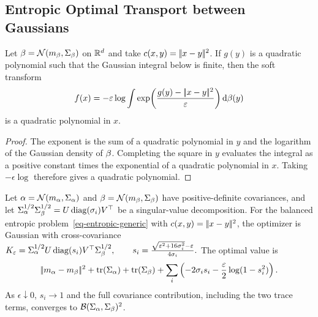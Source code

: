 \subsection{Entropic Optimal Transport between Gaussians}
\label{sec-gaussian-sinkhorn}
\begin{prop}\label{prop-gaussian-sinkhorn-closure}
Let $\beta=\mathcal{N}(m_\beta,\Sigma_\beta)$ on $\mathbb{R}^d$ and take $c(x,y)=|\!| x-y |\!|^2$. If $g(y)$ is a quadratic polynomial such that the Gaussian integral below is finite, then the soft transform
\[
f(x)
=
-\varepsilon\log
\int
\exp\!\left(\frac{g(y)-|\!| x-y |\!|^2}{\varepsilon}\right)
\mathrm{d}\beta(y)
\]
is a quadratic polynomial in $x$.
\end{prop}
\begin{proof}
The exponent is the sum of a quadratic polynomial in $y$ and the logarithm of the Gaussian density of $\beta$. Completing the square in $y$ evaluates the integral as a positive constant times the exponential of a quadratic polynomial in $x$. Taking $-\epsilon\log$ therefore gives a quadratic polynomial.
\end{proof}
\begin{prop}\label{prop-gaussian-sinkhorn-closed-form}
Let $\alpha=\mathcal{N}(m_\alpha,\Sigma_\alpha)$ and $\beta=\mathcal{N}(m_\beta,\Sigma_\beta)$ have positive-definite covariances, and let $\Sigma_\alpha^{1/2}\Sigma_\beta^{1/2}=U\operatorname{diag}(\sigma_i)V^\top$ be a singular-value decomposition. For the balanced entropic problem~\eqref{eq-entropic-generic} with $c(x,y)=|\!| x-y |\!|^2$,
the optimizer is Gaussian with cross-covariance
\(K_\varepsilon = \Sigma_\alpha^{1/2} U\operatorname{diag}(s_i)V^\top \Sigma_\beta^{1/2}, \qquad s_i = \frac{\sqrt{\varepsilon^2+16\sigma_i^2}-\varepsilon}{4\sigma_i}.\)
The optimal value is
\[
|\!| m_\alpha-m_\beta |\!|^2
+
\operatorname{tr}(\Sigma_\alpha)+\operatorname{tr}(\Sigma_\beta)
+
\sum_i
\left(
-2\sigma_i s_i
-\frac{\varepsilon}{2}\log(1-s_i^2)
\right).
\]
As $\epsilon\downarrow0$, $s_i\to1$ and the full covariance contribution, including the two trace terms, converges to $\mathcal{B}(\Sigma_\alpha,\Sigma_\beta)^2$.
\end{prop}
